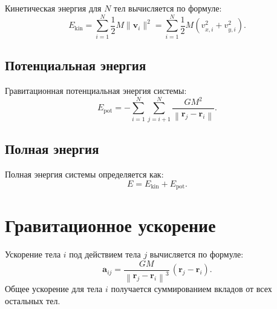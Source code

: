 \documentclass[a4paper,12pt]{article}
\begin{document}
Кинетическая энергия для \( N \) тел вычисляется по формуле:
\begin{equation}
  E_{\text{kin}} = \sum_{i=1}^{N} \frac{1}{2} M \|\mathbf{v}_i\|^2
  = \sum_{i=1}^{N} \frac{1}{2} M \left( v_{x,i}^2 + v_{y,i}^2 \right).
\end{equation}

\subsection{Потенциальная энергия}

Гравитационная потенциальная энергия системы:
\begin{equation}
  E_{\text{pot}} = - \sum_{i=1}^{N} \sum_{j=i+1}^{N} \frac{GM^2}{\left\lVert \mathbf{r}_j - \mathbf{r}_i \right\rVert}.
\end{equation}

\subsection{Полная энергия}

Полная энергия системы определяется как:
\begin{equation}
  E = E_{\text{kin}} + E_{\text{pot}}.
\end{equation}

\section{Гравитационное ускорение}

Ускорение тела \( i \) под действием тела \( j \) вычисляется по формуле:
\begin{equation}
  \mathbf{a}_{ij} = \frac{GM}{\left\lVert \mathbf{r}_j - \mathbf{r}_i \right\rVert^3} \, (\mathbf{r}_j - \mathbf{r}_i).
\end{equation}
Общее ускорение для тела \( i \) получается суммированием вкладов от всех остальных тел.
\end{document}
